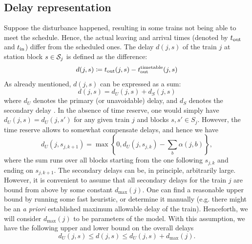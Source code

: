 \subsection{Delay representation}
Suppose the disturbance happened, resulting in some trains not being able to
meet the schedule. Hence, the actual leaving and arrival times (denoted by
$t_\text{out}$ and $t_\text{in}$) differ from the scheduled ones. The delay $d(j, s)$ of the
train $j$ at station block $s \in \mathcal{S}_j$ is defined as the difference:
\begin{equation}
  \label{eq:djs}
  d(j, s) \coloneqq \tout(j, s) - \ttout(j, s) %
\end{equation}
As already mentioned, $d(j, s)$ can be expressed as a sum:
\begin{equation}
  d(j, s) = d_U(j, s) + d_S(j, s)
\end{equation}
where $d_U$ denotes the primary (or unavoidable) delay, and $d_S$ denotes the
secondary delay \cite{dariano}. In the absence of time reserve, one would simply have $d_U(j,
  s) = d_U(j, s')$ for any given train $j$ and blocks $s,s' \in S_{j}$. However,
    the time reserve allows to somewhat compensate delays, and hence we have
    \begin{equation}
      d_U(j, s_{j,k+1}) = \max\left\{0, d_U(j, s_{j,k}) - \sum_{b}\alpha(j, b)\right\},
    \end{equation}
    where the sum runs over all blocks starting from the one following $s_{j,k}$
    and ending on $s_{j,k+1}$. The secondary delays can be, in principle,
    arbitrarily large. However, it is convenient to assume that all secondary
    delays for the train $j$ are bound from above by some constant $d_{\max}(j)$.
One can find a reasonable upper bound by running some fast heuristic, or
determine it manually (e.g. there might be an \emph{a priori} established
maximum allowable delay of the train). Henceforth, we will consider
$d_{\max}(j)$ to be parameters of the model. With this assumption, we have the
following upper and lower bound on the overall delays
\begin{equation}
  d_U(j, s) \le d(j, s) \le d_U(j, s) + d_{\max}(j).
\end{equation}

